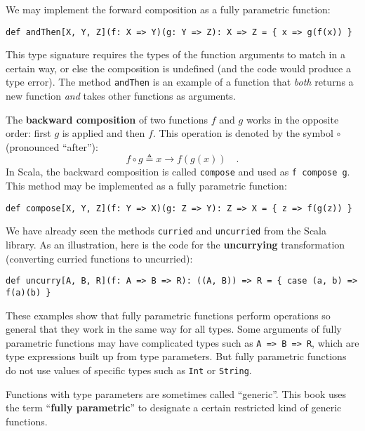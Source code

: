 We may implement the forward composition as a fully parametric function:
\begin{lstlisting}
def andThen[X, Y, Z](f: X => Y)(g: Y => Z): X => Z = { x => g(f(x)) }
\end{lstlisting}
This type signature requires the types of the function arguments to
match in a certain way, or else the composition is undefined (and
the code would produce a type error). The method \lstinline!andThen!
is an example of a function that \emph{both} returns a new function
\emph{and} takes other functions as arguments.

The \textbf{backward composition} of
two functions $f$ and $g$ works in the opposite order: first $g$
is applied and then $f$. This operation is denoted by the symbol
$\circ$ (pronounced \textsf{``}after\textsf{''}):
\begin{equation}
f\circ g\triangleq x\rightarrow f(g(x))\quad.\label{eq:def-of-backward-composition}
\end{equation}
In Scala, the backward composition is called \lstinline!compose!
and used as \lstinline!f compose g!. This method may be implemented
as a fully parametric function:
\begin{lstlisting}
def compose[X, Y, Z](f: Y => X)(g: Z => Y): Z => X = { z => f(g(z)) }
\end{lstlisting}

We have already seen the methods \lstinline!curried! and \lstinline!uncurried!
from the Scala library. As an illustration, here is the code for the
\textbf{uncurrying} transformation (converting
curried functions to uncurried):
\begin{lstlisting}
def uncurry[A, B, R](f: A => B => R): ((A, B)) => R = { case (a, b) => f(a)(b) }
\end{lstlisting}

These examples show that fully parametric functions perform operations
so general that they work in the same way for all types. Some arguments
of fully parametric functions may have complicated types such as \lstinline!A => B => R!,
which are type expressions built up from type parameters. But fully
parametric functions do not use values of specific types such as \lstinline!Int!
or \lstinline!String!.

Functions with type parameters are sometimes called \textsf{``}generic\textsf{''}.
This book uses the term \textsf{``}\textbf{fully
parametric}\textsf{''} to designate a certain restricted kind of generic functions.


